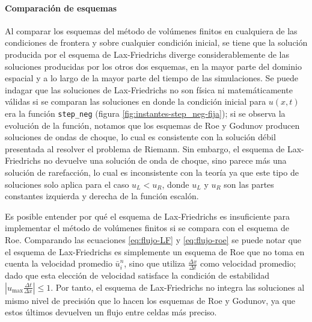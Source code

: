 \documentclass[12pt]{article}
\begin{document}
	\paragraph{Comparación de esquemas}
	
	Al comparar los esquemas del método de volúmenes finitos en cualquiera de las condiciones de frontera y sobre cualquier condición inicial, se tiene que la solución producida por el esquema de Lax-Friedrichs diverge considerablemente de las soluciones producidas por los otros dos esquemas, en la mayor parte del dominio espacial y a lo largo de la mayor parte del tiempo de las simulaciones. Se puede indagar que las soluciones de Lax-Friedrichs no son física ni matemáticamente válidas si se comparan las soluciones en donde la condición inicial para $u(x,t)$ era la función \texttt{step\_neg} (figura \ref{fig:instantes-step_neg-fija}); si se observa la evolución de la función, notamos que los esquemas de Roe y Godunov producen soluciones de ondas de choque, lo cual es consistente con la solución débil presentada al resolver el problema de Riemann. Sin embargo, el esquema de Lax-Friedrichs no devuelve una solución de onda de choque, sino parece más una solución de rarefacción, lo cual es inconsistente con la teoría ya que este tipo de soluciones solo aplica para el caso $u_L < u_R$, donde $u_L$ y  $u_R$ son las partes constantes izquierda y derecha de la función escalón.
	
	Es posible entender por qué el esquema de Lax-Friedrichs es insuficiente para implementar el método de volúmenes finitos si se compara con el esquema de Roe. Comparando las ecuaciones \ref{eq:flujo-LF} y \ref{eq:flujo-roe} se puede notar que el esquema de Lax-Friedrichs es simplemente un esquema de Roe que no toma en cuenta la velocidad promedio $\bar{u}_{i}^{n}$, sino que utiliza $\frac{\Delta x}{\Delta t}$ como velocidad promedio; dado que esta elección de velocidad satisface la condición de estabilidad $|u_{\text{max}}\frac{\Delta t}{\Delta x}| \leq 1$. Por tanto, el esquema de Lax-Friedrichs no integra las soluciones al mismo nivel de precisión que lo hacen los esquemas de Roe y Godunov, ya que estos últimos devuelven un flujo entre celdas más preciso.
	
\end{document}
